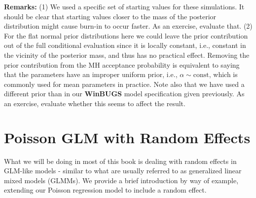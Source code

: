 {\bf Remarks:} (1) We used a specific set of starting values for these
simulations. It should be clear that starting values closer to the
mass of the posterior distribution might cause burn-in to occur
faster. As an exercise, evaluate that.  
(2) For the flat normal prior distributions
here we could leave the prior contribution out of the full conditional
evaluation since it is locally constant, i.e., constant in the vicinity of
the posterior mass, and thus has no practical effect. Removing the
prior contribution from the MH acceptance probability is equivalent to
saying that the parameters have an improper uniform prior, i.e.,
$\alpha \sim \mbox{const}$, which is commonly used for mean parameters
in practice.
Note also that we have
used a different prior than in our {\bf WinBUGS} model specification
given previously. As an
exercise, evaluate whether this seems to affect the result.

\section{Poisson GLM with Random Effects}

What we will be doing in most of this book is dealing with random
effects in GLM-like models - similar to what
are usually referred to as generalized
linear mixed models (GLMMs). We provide a brief introduction by way of
example, extending our Poisson regression model to include a random effect.


